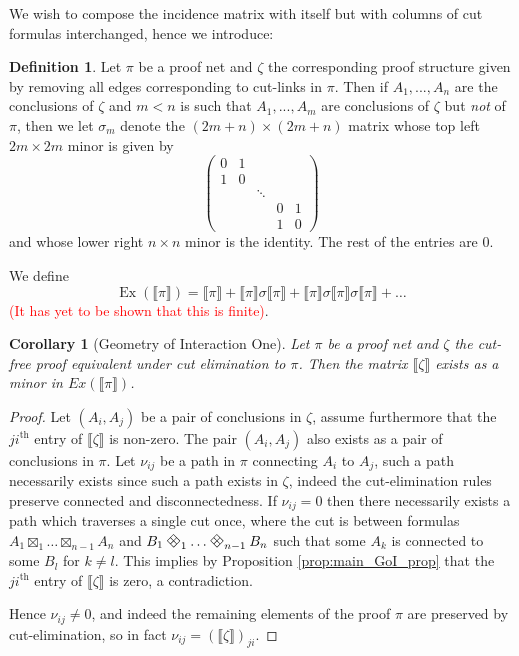 \documentclass[12pt]{article}
\theoremstyle{plain}
\newtheorem{cor}[thm]{Corollary}
\theoremstyle{definition}
\newtheorem{defn}[thm]{Definition} %
\DeclareRobustCommand{\diamondtimes}{%
	\mathbin{\text{\rotatebox[origin=c]{45}{$\boxplus$}}}%
}
\begin{document}
	We wish to compose the incidence matrix with itself but with columns of cut formulas interchanged, hence we introduce:
	\begin{defn}
		Let $\pi$ be a proof net and $\zeta$ the corresponding proof structure given by removing all edges corresponding to cut-links in $\pi$. Then if $A_1,...,A_n$ are the conclusions of $\zeta$ and $m < n$ is such that $A_1,...,A_m$ are conclusions of $\zeta$ but \emph{not} of $\pi$, then we let $\sigma_m$ denote the $(2m + n) \times (2m + n)$ matrix whose top left $2m \times 2m$ minor is given by
		\begin{equation}
			\begin{pmatrix}
				0 & 1\\
				1 & 0\\
				& & \ddots\\
				& & & 0 & 1\\
				& & & 1 & 0
			\end{pmatrix}
		\end{equation}
		and whose lower right $n \times n$ minor is the identity. The rest of the entries are 0.
		
		We define
		\begin{equation}
			\operatorname{Ex}(\llbracket \pi \rrbracket) = \llbracket \pi \rrbracket + \llbracket \pi \rrbracket \sigma \llbracket \pi \rrbracket + \llbracket \pi \rrbracket \sigma \llbracket \pi \rrbracket \sigma \llbracket \pi \rrbracket + \hdots
		\end{equation}
		\textcolor{red}{(It has yet to be shown that this is finite)}.
	\end{defn}
	\begin{cor}[Geometry of Interaction One]\label{cor:GoI_one}
		Let $\pi$ be a proof net and $\zeta$ the cut-free proof equivalent under cut elimination to $\pi$. Then the matrix $\llbracket \zeta\rrbracket$ exists as a minor in $Ex(\llbracket \pi \rrbracket)$.
	\end{cor}
	\begin{proof}
		Let $(A_i,A_j)$ be a pair of conclusions in $\zeta$, assume furthermore that the $ji^{\text{th}}$ entry of $\llbracket \zeta \rrbracket$ is non-zero. The pair $(A_i,A_j)$ also exists as a pair of conclusions in $\pi$. Let $\nu_{ij}$ be a path in $\pi$ connecting $A_i$ to $A_j$, such a path necessarily exists since such a path exists in $\zeta$, indeed the cut-elimination rules preserve connected and disconnectedness. If $\nu_{ij} = 0$ then there necessarily exists a path which traverses a single cut once, where the cut is between formulas $A_1 \boxtimes_1 \hdots \boxtimes_{n-1} A_n$ and $B_1 \diamondtimes_1 \hdots \diamondtimes_{n-1} B_n$ such that some $A_k$ is connected to some $B_l$ for $k \neq l$. This implies by Proposition \ref{prop:main_GoI_prop} that the $ji^{\text{th}}$ entry of $\llbracket \zeta \rrbracket$ is zero, a contradiction.
		
		Hence $\nu_{ij} \neq 0$, and indeed the remaining elements of the proof $\pi$ are preserved by cut-elimination, so in fact $\nu_{ij} = (\llbracket \zeta \rrbracket)_{ji}$.
	\end{proof}
\end{document}
